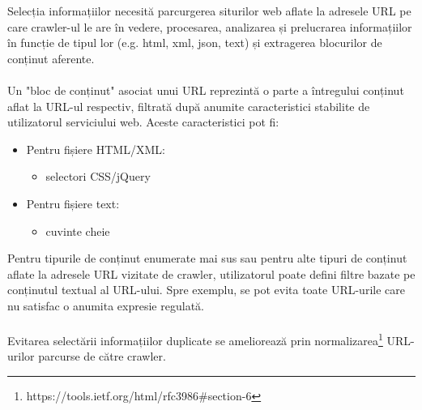 \newcommand{\mimeDescription}{https://www.iana.org/assignments/media-types/media-types.xhtml}
\newcommand{\urlNormalization}{https://tools.ietf.org/html/rfc3986\#section-6}

Selecția informațiilor necesită parcurgerea siturilor web aflate la adresele URL pe care crawler-ul le are în vedere, procesarea, analizarea și prelucrarea informațiilor în funcție de tipul lor (e.g. html, xml, json, text) și extragerea blocurilor de conținut aferente.
\\
\\
Un "bloc de conținut" asociat unui URL reprezintă o parte a întregului conținut aflat la URL-ul respectiv, filtrată după anumite caracteristici stabilite de utilizatorul serviciului web. Aceste caracteristici pot fi:

\begin{itemize}
	\item{Pentru fișiere HTML/XML:
		\begin{itemize}
			\item{selectori CSS/jQuery \cite{css-selectors}}
		\end{itemize}			
	}
	\item{Pentru fișiere text:
		\begin{itemize}
			\item{cuvinte cheie}
		\end{itemize}			
	}
\end{itemize}

\noindent
Pentru tipurile de conținut enumerate mai sus sau pentru alte tipuri de conținut aflate la adresele URL vizitate de crawler, utilizatorul poate defini filtre bazate pe conținutul textual al URL-ului. Spre exemplu, se pot evita toate URL-urile care nu satisfac o anumita expresie regulată. %
\\
\\
Evitarea selectării informațiilor duplicate se ameliorează prin normalizarea\footnote{\urlNormalization} URL-urilor parcurse de către crawler.
